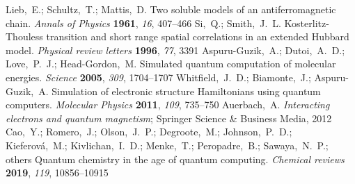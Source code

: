 \documentclass[journal=jctcce,a4paper,manuscript=article]{achemso}
\begin{document}
\begin{mcitethebibliography}{41}
  Lieb,~E.; Schultz,~T.; Mattis,~D. Two soluble models of an antiferromagnetic chain. \emph{Annals of Physics} \textbf{1961}, \emph{16}, 407--466\relax
  \mciteBstWouldAddEndPuncttrue
  \mciteSetBstMidEndSepPunct{\mcitedefaultmidpunct}
  {\mcitedefaultendpunct}{\mcitedefaultseppunct}\relax
  \EndOfBibitem
  Si,~Q.; Smith,~J.~L. Kosterlitz-Thouless transition and short range spatial correlations in an extended Hubbard model. \emph{Physical review letters} \textbf{1996}, \emph{77}, 3391\relax
  \mciteBstWouldAddEndPuncttrue
  \mciteSetBstMidEndSepPunct{\mcitedefaultmidpunct}
  {\mcitedefaultendpunct}{\mcitedefaultseppunct}\relax
  \EndOfBibitem
  Aspuru-Guzik,~A.; Dutoi,~A.~D.; Love,~P.~J.; Head-Gordon,~M. Simulated quantum computation of molecular energies. \emph{Science} \textbf{2005}, \emph{309}, 1704--1707\relax
  \mciteBstWouldAddEndPuncttrue
  \mciteSetBstMidEndSepPunct{\mcitedefaultmidpunct}
  {\mcitedefaultendpunct}{\mcitedefaultseppunct}\relax
  \EndOfBibitem
  Whitfield,~J.~D.; Biamonte,~J.; Aspuru-Guzik,~A. Simulation of electronic structure Hamiltonians using quantum computers. \emph{Molecular Physics} \textbf{2011}, \emph{109}, 735--750\relax
  \mciteBstWouldAddEndPuncttrue
  \mciteSetBstMidEndSepPunct{\mcitedefaultmidpunct}
  {\mcitedefaultendpunct}{\mcitedefaultseppunct}\relax
  \EndOfBibitem
  Auerbach,~A. \emph{Interacting electrons and quantum magnetism}; Springer Science \& Business Media, 2012\relax
  \mciteBstWouldAddEndPuncttrue
  \mciteSetBstMidEndSepPunct{\mcitedefaultmidpunct}
  {\mcitedefaultendpunct}{\mcitedefaultseppunct}\relax
  \EndOfBibitem
  Cao,~Y.; Romero,~J.; Olson,~J.~P.; Degroote,~M.; Johnson,~P.~D.; Kieferov{\'a},~M.; Kivlichan,~I.~D.; Menke,~T.; Peropadre,~B.; Sawaya,~N.~P.; others Quantum chemistry in the age of quantum computing. \emph{Chemical reviews} \textbf{2019}, \emph{119}, 10856--10915\relax
  \mciteBstWouldAddEndPuncttrue
  \mciteSetBstMidEndSepPunct{\mcitedefaultmidpunct}
  {\mcitedefaultendpunct}{\mcitedefaultseppunct}\relax
  \EndOfBibitem

\end{mcitethebibliography}
\end{document}
